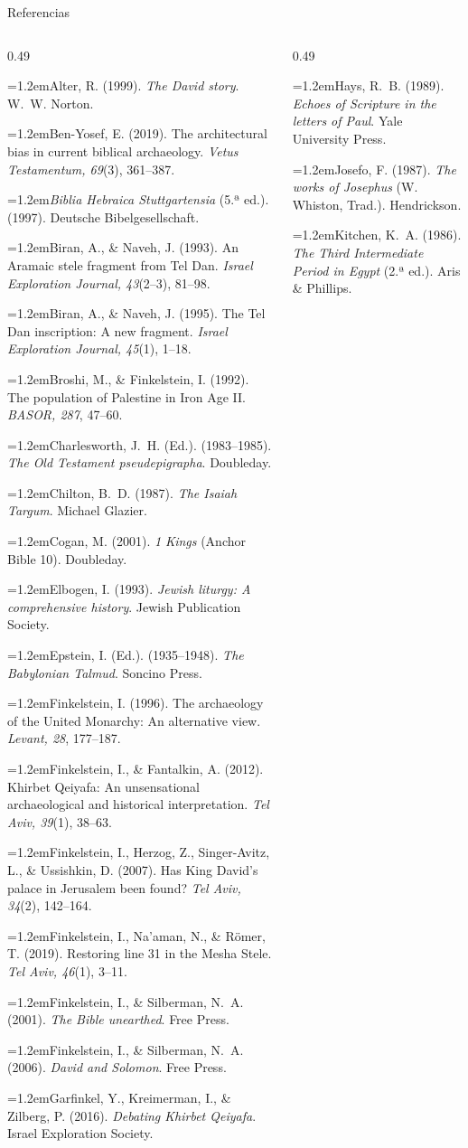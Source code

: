 \documentclass[hyperref={bookmarks=false},aspectratio=169]{beamer}
\newcommand{\refapa}[1]{\par\hangindent=1.2em\hangafter=1\noindent #1\par\vspace{3pt}}
\begin{document}
\begin{frame}{Referencias}
\begin{columns}[t,onlytextwidth]
\begin{column}{0.49\textwidth}\fontsize{4.5}{5.2}\selectfont
\refapa{Alter, R. (1999). \emph{The David story}. W.~W. Norton.}
\refapa{Ben-Yosef, E. (2019). The architectural bias in current biblical archaeology. \emph{Vetus Testamentum, 69}(3), 361--387.}
\refapa{\emph{Biblia Hebraica Stuttgartensia} (5.ª ed.). (1997). Deutsche Bibelgesellschaft.}
\refapa{Biran, A., \& Naveh, J. (1993). An Aramaic stele fragment from Tel Dan. \emph{Israel Exploration Journal, 43}(2--3), 81--98.}
\refapa{Biran, A., \& Naveh, J. (1995). The Tel Dan inscription: A new fragment. \emph{Israel Exploration Journal, 45}(1), 1--18.}
\refapa{Broshi, M., \& Finkelstein, I. (1992). The population of Palestine in Iron Age II. \emph{BASOR, 287}, 47--60.}
\refapa{Charlesworth, J.~H. (Ed.). (1983--1985). \emph{The Old Testament pseudepigrapha}. Doubleday.}
\refapa{Chilton, B.~D. (1987). \emph{The Isaiah Targum}. Michael Glazier.}
\refapa{Cogan, M. (2001). \emph{1 Kings} (Anchor Bible 10). Doubleday.}
\refapa{Elbogen, I. (1993). \emph{Jewish liturgy: A comprehensive history}. Jewish Publication Society.}
\refapa{Epstein, I. (Ed.). (1935--1948). \emph{The Babylonian Talmud}. Soncino Press.}
\refapa{Finkelstein, I. (1996). The archaeology of the United Monarchy: An alternative view. \emph{Levant, 28}, 177--187.}
\refapa{Finkelstein, I., \& Fantalkin, A. (2012). Khirbet Qeiyafa: An unsensational archaeological and historical interpretation. \emph{Tel Aviv, 39}(1), 38--63.}
\refapa{Finkelstein, I., Herzog, Z., Singer-Avitz, L., \& Ussishkin, D. (2007). Has King David's palace in Jerusalem been found? \emph{Tel Aviv, 34}(2), 142--164.}
\refapa{Finkelstein, I., Na'aman, N., \& Römer, T. (2019). Restoring line 31 in the Mesha Stele. \emph{Tel Aviv, 46}(1), 3--11.}
\refapa{Finkelstein, I., \& Silberman, N.~A. (2001). \emph{The Bible unearthed}. Free Press.}
\refapa{Finkelstein, I., \& Silberman, N.~A. (2006). \emph{David and Solomon}. Free Press.}
\refapa{Garfinkel, Y., Kreimerman, I., \& Zilberg, P. (2016). \emph{Debating Khirbet Qeiyafa}. Israel Exploration Society.}
\end{column}
\begin{column}{0.49\textwidth}\fontsize{4.5}{5.2}\selectfont
\refapa{Hays, R.~B. (1989). \emph{Echoes of Scripture in the letters of Paul}. Yale University Press.}
\refapa{Josefo, F. (1987). \emph{The works of Josephus} (W. Whiston, Trad.). Hendrickson.}
\refapa{Kitchen, K.~A. (1986). \emph{The Third Intermediate Period in Egypt} (2.ª ed.). Aris \& Phillips.}

\end{column}
\end{columns}
\end{frame}
\end{document}

